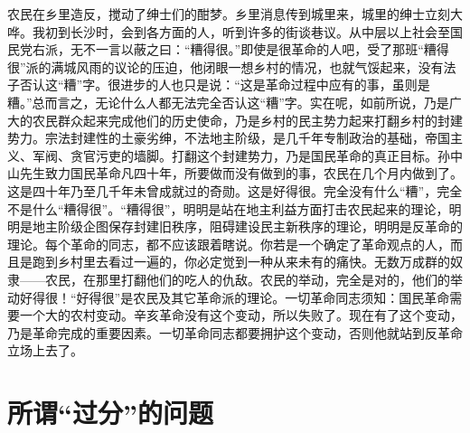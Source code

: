 农民在乡里造反，搅动了绅士们的酣梦。乡里消息传到城里来，城里的绅士立刻大哗。我初到长沙时，会到各方面的人，听到许多的街谈巷议。从中层以上社会至国民党右派，无不一言以蔽之曰：“糟得很。”即使是很革命的人吧，受了那班“糟得很”派的满城风雨的议论的压迫，他闭眼一想乡村的情况，也就气馁起来，没有法子否认这“糟”字。很进步的人也只是说：“这是革命过程中应有的事，虽则是糟。”总而言之，无论什么人都无法完全否认这“糟”字。实在呢，如前所说，乃是广大的农民群众起来完成他们的历史使命，乃是乡村的民主势力起来打翻乡村的封建势力。宗法封建性的土豪劣绅，不法地主阶级，是几千年专制政治的基础，帝国主义、军阀、贪官污吏的墙脚。打翻这个封建势力，乃是国民革命的真正目标。孙中山先生致力国民革命凡四十年，所要做而没有做到的事，农民在几个月内做到了。这是四十年乃至几千年未曾成就过的奇勋。这是好得很。完全没有什么“糟”，完全不是什么“糟得很”。“糟得很”，明明是站在地主利益方面打击农民起来的理论，明明是地主阶级企图保存封建旧秩序，阻碍建设民主新秩序的理论，明明是反革命的理论。每个革命的同志，都不应该跟着瞎说。你若是一个确定了革命观点的人，而且是跑到乡村里去看过一遍的，你必定觉到一种从来未有的痛快。无数万成群的奴隶——农民，在那里打翻他们的吃人的仇敌。农民的举动，完全是对的，他们的举动好得很！“好得很”是农民及其它革命派的理论。一切革命同志须知：国民革命需要一个大的农村变动。辛亥革命没有这个变动，所以失败了。现在有了这个变动，乃是革命完成的重要因素。一切革命同志都要拥护这个变动，否则他就站到反革命立场上去了。

\section{所谓“过分”的问题}

